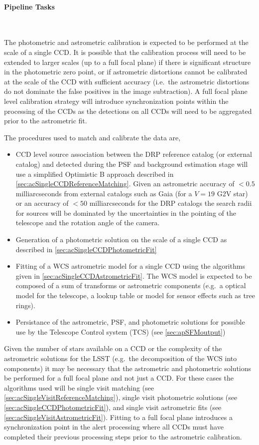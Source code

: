 \paragraph{Pipeline Tasks}~

The photometric and astrometric calibration is expected to be performed at the scale of a single CCD. It is possible that the calibration process will need to be extended to larger scales (up to a full focal plane) if there is significant structure in the photometric zero point, or if astrometric distortions cannot be calibrated at the scale of the CCD with sufficient accuracy (i.e.\ the astrometric distortions do not dominate the false positives in the image subtraction). A full focal plane level calibration strategy will introduce synchronization points within the processing of the CCDs as the detections on all CCDs will need to be aggregated prior to the astrometric fit.

The procedures used to match and calibrate the data are,
\begin{itemize}
\item CCD level source association between the DRP reference catalog (or external catalog) and \Sources detected during the PSF and background estimation stage will use a simplified Optimistic B approach described in \ref{sec:acSingleCCDReferenceMatching}. Given an astrometric accuracy of $<0.5$ milliarcseconds from external catalogs such as Gaia (for a $V=19$ G2V star) or  an accuracy of $<50$ milliarcseconds for the DRP catalogs the search radii for sources will be dominated by the uncertainties in the pointing of the telescope and the rotation angle of the camera.
\item Generation of a photometric solution on the scale of a single CCD as described in \ref{sec:acSingleCCDPhotometricFit}
\item Fitting of a WCS astrometric model for a single CCD  using the algorithms given in \ref{sec:acSingleCCDAstrometricFit}. The WCS model is expected to be composed of a sum of transforms or astrometric components (e.g.\ a optical model for the telescope, a lookup table or model for sensor effects such as tree rings).  
\item Persistance of the astrometric, PSF, and photometric solutions for possible use by the Telescope Control system (TCS) (see \ref{sec:apSFMoutput})
\end{itemize}

Given the number of stars available on a CCD or the complexity of the astrometric solutions for the LSST (e.g.\ the decomposition of the WCS into components) it may be necessary that the astrometric and photometric solutions be performed for a full focal plane and not just a CCD.  For these cases the algorithms used will be single visit matching (see \ref{sec:acSingleVisitReferenceMatching}),  single visit photometric solutions (see \ref{sec:acSingleCCDPhotometricFit}), and single visit astrometric fits (see \ref{sec:acSingleVisitAstrometricFit}). Fitting to a full focal plane introduces a synchronization point in the alert processing where all CCDs must have completed their previous processing steps prior to the astrometric calibration.

